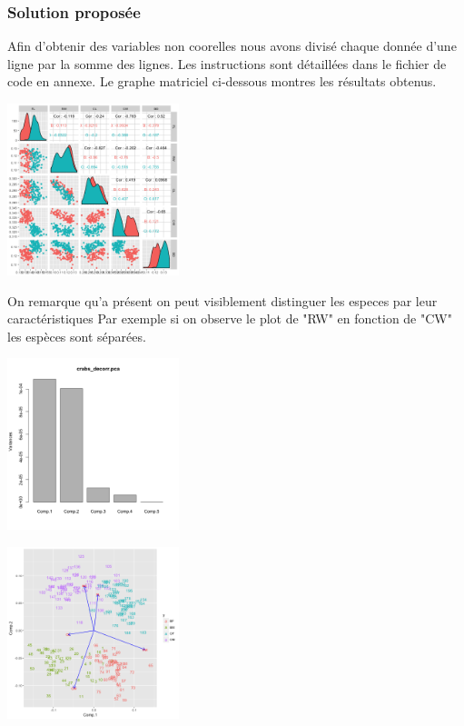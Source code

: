 \documentclass[10pt]{article}
\begin{document}
\subsubsection{Solution proposée}
Afin d'obtenir des variables non coorelles nous avons divisé chaque donnée d'une ligne par la somme des lignes. Les instructions sont détaillées dans le fichier de code en annexe. Le graphe matriciel  ci-dessous montres les résultats obtenus.
\begin{center}
\includegraphics[width=50mm]{Figures/Crabs/matricial_plot_decorr.png}	
\label{fig:crabs_matricial_plot_decorr}
\end{center}
On remarque qu'a présent on peut visiblement distinguer les especes par leur caractéristiques Par exemple si on observe le plot de  "RW" en fonction de "CW" les espèces sont séparées.


	\begin{minipage}{.5\textwidth}
	\centering
	\includegraphics[width=50mm]{Figures/Crabs/decorr_pca_plot.png}
	\label{fig:crabs_pca_plot}
\end{minipage}%
\hspace{0.08\linewidth}
\begin{minipage}{.5\textwidth}
	\centering
	\includegraphics[width=50mm]{Figures/Crabs/decorr_pca_biplot.png}
	\label{fig:crabs_pca_biplot}
\end{minipage}
\end{document}
